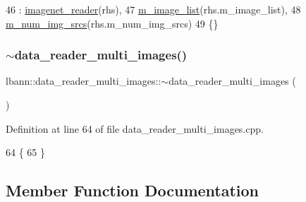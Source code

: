 \begin{DoxyCode}
46   : \hyperlink{classlbann_1_1imagenet__reader_a642331b94cdc3caad8335d65d096141c}{imagenet\_reader}(rhs),
47     \hyperlink{classlbann_1_1data__reader__multi__images_a6d8e2d161c9efff1ac70f847b4a7e9d0}{m\_image\_list}(rhs.m\_image\_list),
48     \hyperlink{classlbann_1_1data__reader__multi__images_a70752a5442e99333fec52def9eadc58f}{m\_num\_img\_srcs}(rhs.m\_num\_img\_srcs)
49 \{\}
\end{DoxyCode}
\mbox{\label{classlbann_1_1data__reader__multi__images_a172a9a9cfe4406d876172679c1c6238a}} 
\subsubsection{\texorpdfstring{$\sim$data\+\_\+reader\+\_\+multi\+\_\+images()}{~data\_reader\_multi\_images()}}
{\footnotesize\ttfamily lbann\+::data\+\_\+reader\+\_\+multi\+\_\+images\+::$\sim$data\+\_\+reader\+\_\+multi\+\_\+images (\begin{DoxyParamCaption}{ }\end{DoxyParamCaption})\hspace{0.3cm}{\ttfamily [override]}}



Definition at line 64 of file data\+\_\+reader\+\_\+multi\+\_\+images.\+cpp.


\begin{DoxyCode}
64                                                     \{
65 \}
\end{DoxyCode}


\subsection{Member Function Documentation}
\mbox{\label{classlbann_1_1data__reader__multi__images_a46e1b7fab6ac5af4398cb9b5da900a74}} 
